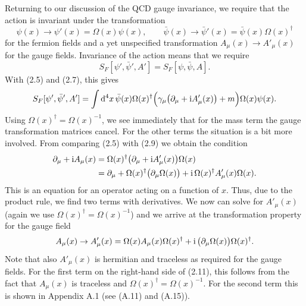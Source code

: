 Returning to our discussion of the QCD gauge invariance, we require that the
action is invariant under the transformation
\begin{equation}
  \psi(x) \to \psi'(x) = \Omega(x)\psi(x) , \qquad
  \bar\psi(x) \to \bar\psi'(x) = \bar\psi(x)\Omega(x)^\dagger
\end{equation}
for the fermion fields and a yet unspecified transformation
$A_\mu(x) \to A'_\mu(x)$ for the gauge fields. Invariance of the action
means that we require
\begin{equation}
  S_F[\psi', \bar\psi', A'] = S_F[\psi, \bar\psi, A] .
\end{equation}
With (2.5) and (2.7), this gives
\begin{equation}
  S_F[\psi', \bar\psi', A'] =
    \int \mathrm{d}^4 x\,
    \bar\psi(x)\Omega(x)^\dagger
    \Big(\gamma_\mu \big(\partial_\mu + \mathrm{i} A'_\mu(x)\big) + m\Big)
    \Omega(x)\psi(x) .
\end{equation}
Using $\Omega(x)^\dagger = \Omega(x)^{-1}$, we see immediately that for the
mass term the gauge transformation matrices cancel. For the other terms the
situation is a bit more involved. From comparing (2.5) with (2.9) we obtain
the condition
\begin{equation}
  \begin{split}
    \partial_\mu + \mathrm{i} A_\mu(x) &=
      \Omega(x)^\dagger \big(\partial_\mu + \mathrm{i} A'_\mu(x)\big) \Omega(x) \\
    &= \partial_\mu + \Omega(x)^\dagger \big(\partial_\mu \Omega(x)\big)
      + \mathrm{i}\, \Omega(x)^\dagger A'_\mu(x)\Omega(x) .
  \end{split}
\end{equation}
This is an equation for an operator acting on a function of $x$. Thus, due
to the product rule, we find two terms with derivatives. We now can solve
for $A'_\mu(x)$ (again we use $\Omega(x)^\dagger = \Omega(x)^{-1}$) and we
arrive at the transformation property for the gauge field
\begin{equation}
  A_\mu(x) \to A'_\mu(x)
  = \Omega(x) A_\mu(x) \Omega(x)^\dagger
    + \mathrm{i}\, \big(\partial_\mu \Omega(x)\big) \Omega(x)^\dagger .
\end{equation}
Note that also $A'_\mu(x)$ is hermitian and traceless as required for the
gauge fields. For the first term on the right-hand side of (2.11), this
follows from the fact that $A_\mu(x)$ is traceless and
$\Omega(x)^\dagger = \Omega(x)^{-1}$. For the second term this is shown in
Appendix A.1 (see (A.11) and (A.15)).

